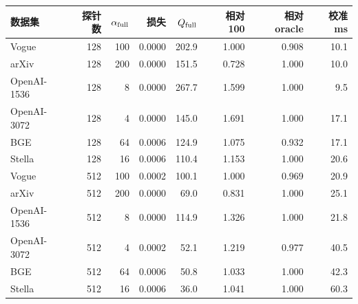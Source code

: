 \begin{tabular}{@{}lrrrrrrr@{}}
\toprule
数据集 & 探针数 & $\alpha_{\rm full}$ & 损失 & $Q_{\rm full}$ & 相对 100 & 相对 oracle & 校准 ms \\
\midrule
Vogue & 128 & 100 & 0.0000 & 202.9 & 1.000 & 0.908 & 10.1 \\
arXiv & 128 & 200 & 0.0000 & 151.5 & 0.728 & 1.000 & 10.0 \\
OpenAI-1536 & 128 & 8 & 0.0000 & 267.7 & 1.599 & 1.000 & 9.5 \\
OpenAI-3072 & 128 & 4 & 0.0000 & 145.0 & 1.691 & 1.000 & 17.1 \\
BGE & 128 & 64 & 0.0006 & 124.9 & 1.075 & 0.932 & 17.1 \\
Stella & 128 & 16 & 0.0006 & 110.4 & 1.153 & 1.000 & 20.6 \\
Vogue & 512 & 100 & 0.0002 & 100.1 & 1.000 & 0.969 & 20.9 \\
arXiv & 512 & 200 & 0.0000 & 69.0 & 0.831 & 1.000 & 25.1 \\
OpenAI-1536 & 512 & 8 & 0.0000 & 114.9 & 1.326 & 1.000 & 21.8 \\
OpenAI-3072 & 512 & 4 & 0.0002 & 52.1 & 1.219 & 0.977 & 40.5 \\
BGE & 512 & 64 & 0.0006 & 50.8 & 1.033 & 1.000 & 42.3 \\
Stella & 512 & 16 & 0.0006 & 36.0 & 1.041 & 1.000 & 60.3 \\
\bottomrule
\end{tabular}
